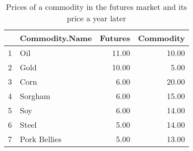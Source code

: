 \documentclass[11pt]{exam}
\begin{document}
\begin{questions}
%
\begin{table}[ht]
\begin{center}
\begin{tabular}{rlrr}
  \hline
 & Commodity.Name & Futures & Commodity \\ 
  \hline
1 & Oil & 11.00 & 10.00 \\ 
  2 & Gold & 10.00 & 5.00 \\ 
  3 & Corn & 6.00 & 20.00 \\ 
  4 & Sorgham & 6.00 & 15.00 \\ 
  5 & Soy & 6.00 & 14.00 \\ 
  6 & Steel & 5.00 & 14.00 \\ 
  7 & Pork Bellies & 5.00 & 13.00 \\ 
   \hline
\end{tabular}
\caption{Prices of a commodity in the futures market and its price a year later}
\label{tab:futures}
\end{center}
\end{table}%

\end{questions}

\begin{center} \gradetable[v][questions] \end{center}
\end{document}
